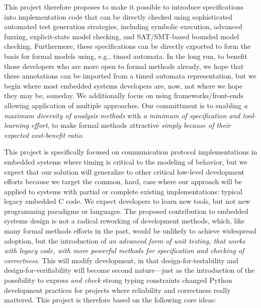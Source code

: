 This project therefore proposes to make it possible to introduce specifications into implementation code that can be directly checked using sophisticated automated test generation strategies, including symbolic execution, advanced fuzzing, explicit-state model checking, and SAT/SMT-based bounded model checking.   Furthermore, these specifications can be directly exported to form the basis for formal models using, e.g., timed automata.  In the long run, to benefit those developers who are more open to formal methods already, we hope that these annotations can be imported from a timed automata representation, but we begin where most embedded systems developers are, now, not where we hope they may be, someday.
We additionally focus on using frameworks/front-ends allowing application of multiple approaches.  Our committment is to enabling \emph{a maximum diversity of analysis methods} with \emph{a minimum of specification and tool-learning effort}, to make formal methods attractive \emph{simply because of their expected cost-benefit ratio}.

This project is specifically focused on communication protocol implementations in embedded systems where timing is critical to the modeling of behavior, but we expect that our solution will generalize to other critical low-level development efforts because we target the common, hard, case where our approach will be applied to systems with partial or complete existing implementations: typical legacy embedded C code.  We expect developers to learn new tools, but not new programming paradigms or languages.  The proposed contribution to embedded systems design is not a radical reworking of development methods, which, like many formal methods efforts in the past, would be unlikely to achieve widespread adoption, but the introduction of \emph{an advanced form of unit testing, that works with legacy code, with more powerful methods for specification and checking of correctness.}  This will modify development, in that design-for-testability and design-for-verifiability will become second nature---just as the introduction of the possibility to express \emph{and check} strong typing constraints changed Python development practices for projects where reliability and correctness really mattered.  This project is therefore based on the following core ideas:

